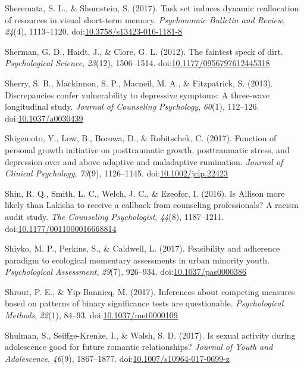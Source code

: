 \documentclass[english,man]{apa6}
\begin{document}
\hypertarget{ref-Sheremata2016}{}
Sheremata, S. L., \& Shomstein, S. (2017). Task set induces dynamic
reallocation of resources in visual short-term memory. \emph{Psychonomic
Bulletin and Review}, \emph{24}(4), 1113--1120.
doi:\href{https://doi.org/10.3758/s13423-016-1181-8}{10.3758/s13423-016-1181-8}

\hypertarget{ref-Sherman2012}{}
Sherman, G. D., Haidt, J., \& Clore, G. L. (2012). The faintest speck of
dirt. \emph{Psychological Science}, \emph{23}(12), 1506--1514.
doi:\href{https://doi.org/10.1177/0956797612445318}{10.1177/0956797612445318}

\hypertarget{ref-Sherry2013}{}
Sherry, S. B., Mackinnon, S. P., Macneil, M. A., \& Fitzpatrick, S.
(2013). Discrepancies confer vulnerability to depressive symptoms: A
three-wave longitudinal study. \emph{Journal of Counseling Psychology},
\emph{60}(1), 112--126.
doi:\href{https://doi.org/10.1037/a0030439}{10.1037/a0030439}

\hypertarget{ref-Shigemoto2017}{}
Shigemoto, Y., Low, B., Borowa, D., \& Robitschek, C. (2017). Function
of personal growth initiative on posttraumatic growth, posttraumatic
stress, and depression over and above adaptive and maladaptive
rumination. \emph{Journal of Clinical Psychology}, \emph{73}(9),
1126--1145.
doi:\href{https://doi.org/10.1002/jclp.22423}{10.1002/jclp.22423}

\hypertarget{ref-Shin2016}{}
Shin, R. Q., Smith, L. C., Welch, J. C., \& Ezeofor, I. (2016). Is
Allison more likely than Lakisha to receive a callback from counseling
professionals? A racism audit study. \emph{The Counseling Psychologist},
\emph{44}(8), 1187--1211.
doi:\href{https://doi.org/10.1177/0011000016668814}{10.1177/0011000016668814}

\hypertarget{ref-Shiyko2017}{}
Shiyko, M. P., Perkins, S., \& Caldwell, L. (2017). Feasibility and
adherence paradigm to ecological momentary assessments in urban minority
youth. \emph{Psychological Assessment}, \emph{29}(7), 926--934.
doi:\href{https://doi.org/10.1037/pas0000386}{10.1037/pas0000386}

\hypertarget{ref-Shrout2017}{}
Shrout, P. E., \& Yip-Bannicq, M. (2017). Inferences about competing
measures based on patterns of binary significance tests are
questionable. \emph{Psychological Methods}, \emph{22}(1), 84--93.
doi:\href{https://doi.org/10.1037/met0000109}{10.1037/met0000109}

\hypertarget{ref-Shulman2017}{}
Shulman, S., Seiffge-Krenke, I., \& Walsh, S. D. (2017). Is sexual
activity during adolescence good for future romantic relationships?
\emph{Journal of Youth and Adolescence}, \emph{46}(9), 1867--1877.
doi:\href{https://doi.org/10.1007/s10964-017-0699-z}{10.1007/s10964-017-0699-z}
\end{document}
